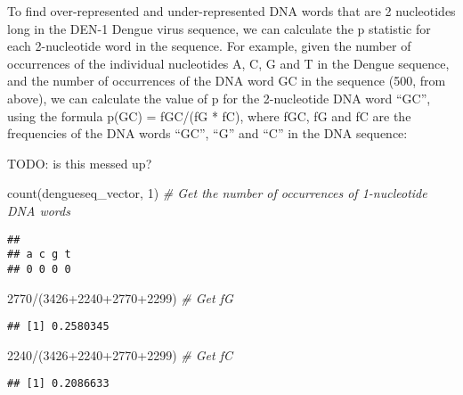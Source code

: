 \documentclass[
]{book}
\newenvironment{Shaded}{\begin{snugshade}}{\end{snugshade}}
\newcommand{\CommentTok}[1]{\textcolor[rgb]{0.56,0.35,0.01}{\textit{#1}}}
\newcommand{\DecValTok}[1]{\textcolor[rgb]{0.00,0.00,0.81}{#1}}
\newcommand{\FunctionTok}[1]{\textcolor[rgb]{0.00,0.00,0.00}{#1}}
\newcommand{\NormalTok}[1]{#1}
\newcommand{\SpecialCharTok}[1]{\textcolor[rgb]{0.00,0.00,0.00}{#1}}
\begin{document}
To find over-represented and under-represented DNA words that are 2 nucleotides long in the DEN-1 Dengue virus sequence, we can calculate the p statistic for each 2-nucleotide word in the sequence. For example, given the number of occurrences of the individual nucleotides A, C, G and T in the Dengue sequence, and the number of occurrences of the DNA word GC in the sequence (500, from above), we can calculate the value of p for the 2-nucleotide DNA word ``GC'', using the formula p(GC) = fGC/(fG * fC), where fGC, fG and fC are the frequencies of the DNA words ``GC'', ``G'' and ``C'' in the DNA sequence:

TODO: is this messed up?

\begin{Shaded}
\begin{Highlighting}[]
\FunctionTok{count}\NormalTok{(dengueseq\_vector, }\DecValTok{1}\NormalTok{) }\CommentTok{\# Get the number of occurrences of 1{-}nucleotide DNA words}
\end{Highlighting}
\end{Shaded}

\begin{verbatim}
## 
## a c g t 
## 0 0 0 0
\end{verbatim}

\begin{Shaded}
\begin{Highlighting}[]
 \DecValTok{2770}\SpecialCharTok{/}\NormalTok{(}\DecValTok{3426}\SpecialCharTok{+}\DecValTok{2240}\SpecialCharTok{+}\DecValTok{2770}\SpecialCharTok{+}\DecValTok{2299}\NormalTok{) }\CommentTok{\# Get fG}
\end{Highlighting}
\end{Shaded}

\begin{verbatim}
## [1] 0.2580345
\end{verbatim}

\begin{Shaded}
\begin{Highlighting}[]
 \DecValTok{2240}\SpecialCharTok{/}\NormalTok{(}\DecValTok{3426}\SpecialCharTok{+}\DecValTok{2240}\SpecialCharTok{+}\DecValTok{2770}\SpecialCharTok{+}\DecValTok{2299}\NormalTok{) }\CommentTok{\# Get fC}
\end{Highlighting}
\end{Shaded}

\begin{verbatim}
## [1] 0.2086633
\end{verbatim}
\end{document}
